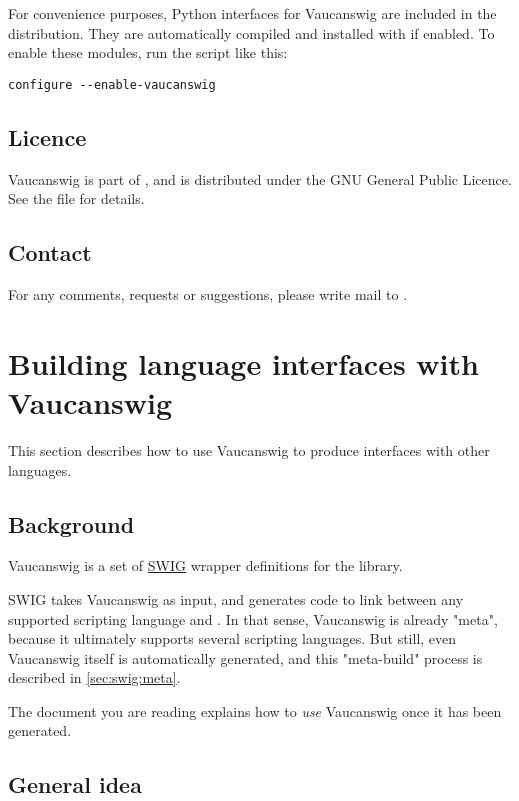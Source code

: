 For convenience purposes, Python interfaces for Vaucanswig are
included in the distribution.  They are automatically compiled and
installed with \Vauc if enabled.  To enable these modules, run the
 script like this:

\begin{lstlisting}
configure --enable-vaucanswig
\end{lstlisting}

\subsection{Licence}

Vaucanswig  is part  of \Vauc,  and is  distributed under  the GNU
General Public Licence. See the file  for details.

\subsection{Contact}

For  any  comments, requests  or  suggestions,  please  write mail  to
.


\section{Building language interfaces with Vaucanswig}
\label{sec:swig:build}

This section describes how to use Vaucanswig to produce interfaces
with other languages.

\subsection{Background}

Vaucanswig is a set of \href{http://www.swig.org}{SWIG} wrapper
definitions for the \Vauc library.

SWIG takes Vaucanswig as input, and generates code to link between any
supported scripting language and \Cxx. In that sense, Vaucanswig is
already "meta", because it ultimately supports several scripting
languages. But still, even Vaucanswig itself is automatically
generated, and this "meta-build" process is described in
\autoref{sec:swig:meta}.

The document you are reading explains how to \emph{use} Vaucanswig once it
has been generated.


\subsection{General idea}

